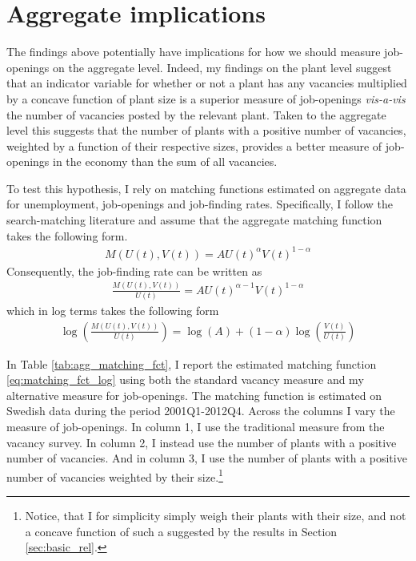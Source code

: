 \section{Aggregate implications}
\label{sec:agg_implications}

The findings above potentially have implications for how we should measure job-openings on the aggregate level. Indeed, my findings on the plant level suggest that an indicator variable for whether or not a plant has any vacancies multiplied by a concave function of plant size is a superior measure of job-openings \emph{vis-a-vis} the number of vacancies posted by the relevant plant. Taken to the aggregate level this suggests that the number of plants with a positive number of vacancies, weighted by a function of their respective sizes, provides a better measure of job-openings in the economy than the sum of all vacancies. 

To test this hypothesis, I rely on matching functions estimated on aggregate data for unemployment, job-openings and job-finding rates. Specifically, I follow the search-matching literature and assume that the aggregate matching function takes the following form. 
\begin{align}
M(U(t), V(t))=AU(t)^{\alpha}V(t)^{1-\alpha}
\end{align}
Consequently, the job-finding rate can be written as
\begin{align}
\frac{M(U(t), V(t))}{U(t)}=AU(t)^{\alpha-1} V(t)^{1-\alpha}
\end{align}
which in log terms takes the following form
\begin{align}
\log\left(\frac{M(U(t), V(t))}{U(t)}\right) =\log(A)+\left(1-\alpha\right)\log\left(\frac{V(t)}{U(t)}\right) \label{eq:matching_fct_log}
\end{align}

In Table \ref{tab:agg_matching_fct}, I report the estimated matching function \eqref{eq:matching_fct_log} using both the standard vacancy measure and my alternative measure for job-openings.  The matching function is estimated on Swedish data during the period 2001Q1-2012Q4. Across the columns I vary the measure of job-openings. In column 1, I use the traditional measure from the vacancy survey. In column 2, I instead use the number of plants with a positive number of vacancies. And in column 3, I use the number of plants with a positive number of vacancies weighted by their size.\footnote{Notice, that I for simplicity simply weigh their plants with their size, and not a concave function of such a suggested by the results in Section \ref{sec:basic_rel}.}

